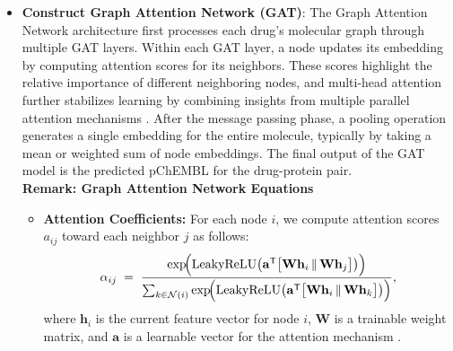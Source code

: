 \documentclass[fontsize=11pt]{article}
\begin{document}
\begin{itemize}
\begin{lstlisting}[language=Python]
    for bond in mol.GetBonds():
        i = bond.GetBeginAtomIdx()
        j = bond.GetEndAtomIdx()
        bond_feat = {
            "bond_type": str(bond.GetBondType()),
            "conjugated": int(bond.GetIsConjugated()),
            "ring": int(bond.IsInRing())
        }
        edge_features[(i, j)] =  bond_feat
        # Undirected adjacency
        adjacency_list.append((i, j))
        adjacency_list.append((j, i))
        neighbours[i].append(j)
        neighbours[j].append(i)

    return mol, node_features, edge_features, adjacency_list, neighbours
\end{lstlisting}

\noindent
\emph{Explanation:} We record atom-level descriptors (atomic number, formal charge, etc.) and 
bond-level descriptors (bond type, conjugation, ring membership). The adjacency list is built
from each bond pair (i, j). This structure can be fed into a graph neural network or converted 
into other GNN frameworks like PyTorch Geometric or DGL.

\item \textbf{Construct Graph Attention Network (GAT)}: The Graph Attention Network architecture first processes each drug’s molecular graph through multiple GAT layers. Within each GAT layer, a node updates its embedding by computing attention scores for its neighbors. These scores highlight the relative importance of different neighboring nodes, and multi-head attention further stabilizes learning by combining insights from multiple parallel attention mechanisms \cite{Velickovic2018}. After the message passing phase, a pooling operation generates a single embedding for the entire molecule, typically by taking a mean or weighted sum of node embeddings. The final output of the GAT model is the predicted pChEMBL for the drug-protein pair. \\
    
    \small \textbf{Remark: Graph Attention Network Equations}

    \begin{itemize}
            \item[$\circ$] \textbf{Attention Coefficients:} For each node $i$, we compute attention scores $a_{ij}$ toward each neighbor $j$ as follows:
            \[
                \alpha_{ij} \;=\;
                \frac{\exp\!\Bigl(\mathrm{LeakyReLU}\bigl(\mathbf{a}^\mathsf{T}
                    \bigl[\mathbf{W}\mathbf{h}_i \,\|\, \mathbf{W}\mathbf{h}_j\bigr]\bigr)\Bigr)}
                     {\sum_{k \in \mathcal{N}(i)} \exp\!\Bigl(\mathrm{LeakyReLU}\bigl(\mathbf{a}^\mathsf{T}
                       \bigl[\mathbf{W}\mathbf{h}_i \,\|\, \mathbf{W}\mathbf{h}_k\bigr]\bigr)\Bigr)},
            \]
            where $\mathbf{h}_i$ is the current feature vector for node $i$, $\mathbf{W}$ is a trainable weight matrix, and $\mathbf{a}$ is a learnable vector for the attention mechanism \cite{Velickovic2018}.


\end{itemize}
\end{itemize}
\end{document}
